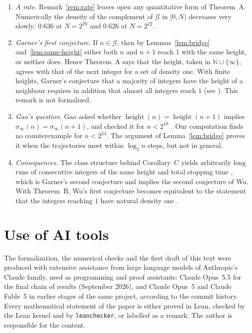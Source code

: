 \documentclass[11pt]{amsart}
\theoremstyle{definition}
\theoremstyle{remark}
\newcommand{\N}{\mathbb{N}}
\begin{document}
\begin{enumerate}
\item \emph{A rate.} Remark~\ref{rem:rate} leaves open any quantitative form of Theorem~A. Numerically the density of the complement of $\mathcal G$ in $[0,N)$ decreases very slowly: $0.636$ at $N=2^{20}$ and $0.626$ at $N=2^{22}$.
\item \emph{Garner's first conjecture.} If $n\in\mathcal G$, then by Lemmas~\ref{lem:bridge} and~\ref{lem:same-height} either both $n$ and $n+1$ reach $1$ with the same height, or neither does. Hence Theorem~A says that the height, taken in $\N\cup\{\infty\}$, agrees with that of the next integer for a set of density one. With finite heights, Garner's conjecture that a majority of integers have the height of a neighbour requires in addition that almost all integers reach $1$ (see \cite{SaidWu}). This remark is not formalized.
\item \emph{Gao's question.} Gao asked whether $\operatorname{height}(n)=\operatorname{height}(n+1)$ implies $\sigma_\infty(n)=\sigma_\infty(n+1)$, and checked it for $n<2^{18}$ \cite[p.~266]{Gao93}. Our computation finds no counterexample for $n<2^{24}$. The argument of Lemma~\ref{lem:bridge} proves it when the trajectories meet within $\log_2 n$ steps, but not in general.
\item \emph{Consequences.} The class structure behind Corollary~C yields arbitrarily long runs of consecutive integers of the same height and total stopping time \cite{SaidGarner}, which is Garner's second conjecture and implies the second conjecture of Wu. With Theorem~B, Wu's first conjecture becomes equivalent to the statement that the integers reaching $1$ have natural density one \cite{SaidWu}.
\end{enumerate}

\section*{Use of AI tools}
The formalization, the numerical checks and the first draft of this text were produced with extensive assistance from large language models of Anthropic's Claude family, used as programming and proof assistants: Claude Opus~5.5 for the final chain of results (September 2026), and Claude Opus~5 and Claude Fable~5 in earlier stages of the same project, according to the commit history. Every mathematical statement of the paper is either proved in Lean, checked by the Lean kernel and by \texttt{leanchecker}, or labelled as a remark. The author is responsible for the content.
\end{document}
